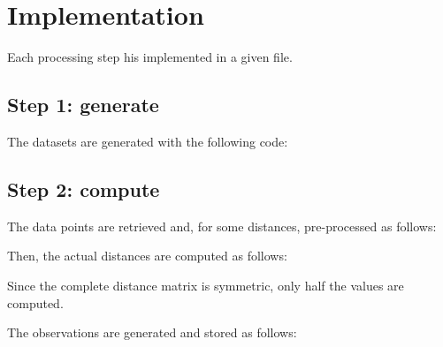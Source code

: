 \documentclass[12pt,a4paper,fleqn]{tufte-handout}
\begin{document}
  
\section{Implementation}

Each processing step his implemented in a given file.

\subsection{Step 1: generate}

The datasets are generated with the following code:


\subsection{Step 2: compute} 


The data points are retrieved and, for some distances, pre-processed as follows:
 

Then, the actual distances are computed as follows:
 
Since the complete distance matrix is symmetric, only half the values are computed.

The observations are generated and stored as follows:
   
  
  
% 
% 
  
\end{document}
